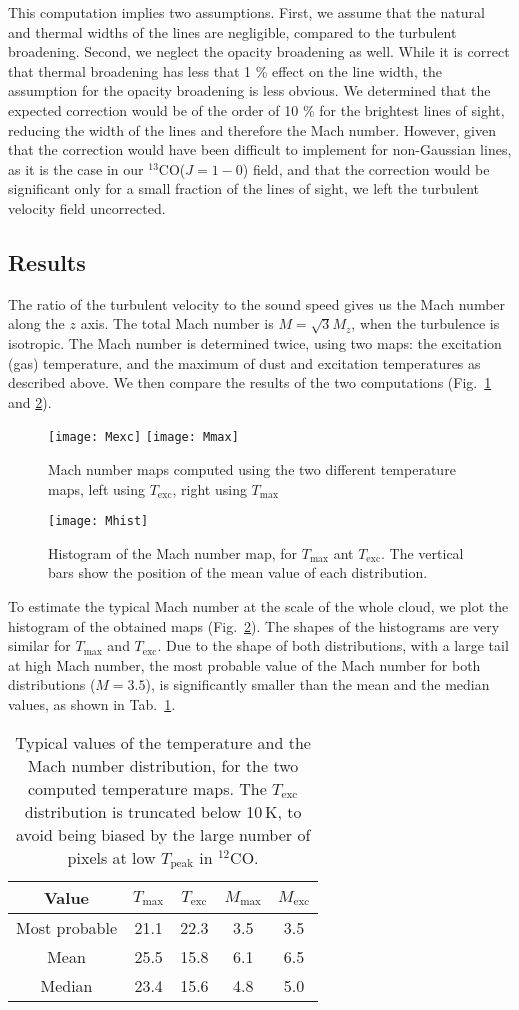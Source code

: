 \documentclass[structabstract]{aa}
\newcommand{\emm}[1]{\ensuremath{#1}}
\newcommand{\emr}[1]{\emm{\mathrm{#1}}}
\newcommand{\unit}[1]{\emr{\,#1}}
\newcommand{\K}{\unit{K}}
\newcommand{\FigMachImage}{%
  \begin{figure}
    \centering
    \texttt{[image: Mexc]}
    \texttt{[image: Mmax]}
    \caption{Mach number maps computed using the two different temperature maps, left using $T_\emr{exc}$, right using $T_\emr{max}$}
    \label{fig:mach:ima}
  \end{figure}}
\newcommand{\FigMachHist}{%
  \begin{figure}
    \centering
    \texttt{[image: Mhist]}
    \caption{Histogram of the Mach number map, for $T_\emr{max}$ ant $T_\emr{exc}$. The vertical bars show the position of the mean value of each distribution.}
    \label{fig:mach:hist}
  \end{figure}}
\newcommand{\TabMach}{%
  \begin{table}
    \centering
    \caption{Typical values of the temperature and the Mach number distribution, for the two computed temperature maps. The $T_{\emr{exc}}$ distribution is truncated below 10\K, to avoid being biased by the large number of pixels at low $T_\emr{peak}$ in $^{12}$CO.}
    \begin{tabular}{ccccc}
      \hline
      \hline
      Value  & $T_{\emr{max}}$ & $T_{\emr{exc}}$ & $M_{\emr{max}}$ & $M_{\emr{exc}}$ \\
      \hline
      Most probable & 21.1 & 22.3 & 3.5 & 3.5 \\
      Mean          & 25.5 & 15.8 & 6.1 & 6.5 \\
      Median        & 23.4 & 15.6 & 4.8 & 5.0 \\
      \hline
    \end{tabular}
    \label{tab:mach}
  \end{table}}
\begin{document}
\begin{appendix}
This computation implies two assumptions. First, we assume that the natural and thermal widths of the lines are negligible, compared to the turbulent broadening. Second, we neglect the opacity broadening as well. While it is correct that thermal broadening has less that 1 \% effect on the line width, the assumption for the opacity broadening is less obvious. We determined that the expected correction would be of the order of 10 \% for the brightest lines of sight, reducing the width of the lines and therefore the Mach number. However, given that the correction would have been difficult to implement for non-Gaussian lines, as it is the case in our $^{13}$CO($J=1-0$) field, and that the correction would be significant only for a small fraction of the lines of sight, we left the turbulent velocity field uncorrected.

\subsection{Results}
The ratio of the turbulent velocity to the sound speed gives us the Mach number along the $z$ axis. The total Mach number is $M = \sqrt{3}M_z$, when the turbulence is isotropic. The Mach number is determined twice, using two maps: the excitation (gas) temperature, and the maximum of dust and excitation temperatures as described above. We then compare the results of the two computations (Fig.~\ref{fig:mach:ima} and \ref{fig:mach:hist}).

\FigMachImage{}%

\FigMachHist{}%

To estimate the typical Mach number at the scale of the whole cloud, we plot the histogram of the obtained maps (Fig.~\ref{fig:mach:hist}). The shapes of the histograms are very similar for $T_\emr{max}$ and $T_\emr{exc}$. Due to the shape of both distributions, with a large tail at high Mach number, the most probable value of the Mach number for both distributions ($M = 3.5$), is significantly smaller than the mean and the median values, as shown in Tab.~\ref{tab:mach}.

\TabMach{}

\end{appendix}


\end{document}

